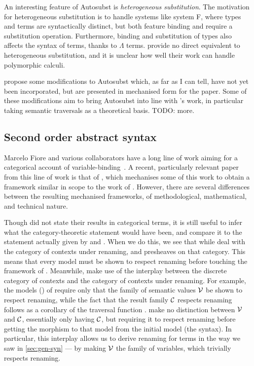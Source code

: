 An interesting feature of Autosubst is \emph{heterogeneous substitution}.
The motivation for heterogeneous substitution is to handle systems like system
F, where types and terms are syntactically distinct, but both feature binding
and require a substitution operation.
Furthermore, binding and substitution of types also affects the syntax of terms,
thanks to $\Lambda$ terms.
\citeauthor{AACMM21} provide no direct equivalent to heterogeneous substitution,
and it is unclear how well their work can handle polymorphic calculi.

\citet{Autosubst18} propose some modifications to Autosubst which, as far as I
can tell, have not yet been incorporated, but are presented in mechanised form
for the paper.
Some of these modifications aim to bring Autosubst into line with
\citeauthor{AACMM21}'s work, in particular taking semantic traversals as a
theoretical basis.
TODO: more.

\subsection{Second order abstract syntax}\label{sec:fiore}

Marcelo Fiore and various collaborators have a long line of work aiming for a
categorical account of variable-binding~\citep{FPT99,Fiore08,FH13,FH10,FM10}.
A recent, particularly relevant paper from this line of work is that of
\citet{FS22}, which mechanises some of this work to obtain a framework similar
in scope to the work of \citet{AACMM21}.
However, there are several differences between the resulting mechanised
frameworks, of methodological, mathematical, and technical nature.

Though \citet{AACMM21} did not state their results in categorical terms, it is
still useful to infer what the category-theoretic statement would have been, and
compare it to the statement actually given by \citet{FPT99} and \citet{FS22}.
When we do this, we see that while \citeauthor{FPT99} deal with the category of
contexts under renaming, and presheaves on that category.
This means that every model must be shown to respect renaming before touching
the framework of \citeauthor{FS22}.
Meanwhile, \citeauthor{AACMM21} make use of the interplay between the discrete
category of contexts and the category of contexts under renaming.
For example, the models () of \citet{AACMM21} require only
that the family of semantic values $\mathcal V$ be shown to respect renaming, while the
fact that the result family $\mathcal C$ respects renaming follows as a corollary of the
traversal function .
 make no distinction between $\mathcal V$ and $\mathcal C$, essentially only
having $\mathcal C$, but requiring it to respect renaming before getting the morphism
to that model from the initial model (the syntax).
In particular, this interplay allows us to derive renaming for terms in the way
we saw in \cref{sec:gen-syn} --- by making $\mathcal V$ the family of variables, which
trivially respects renaming.

